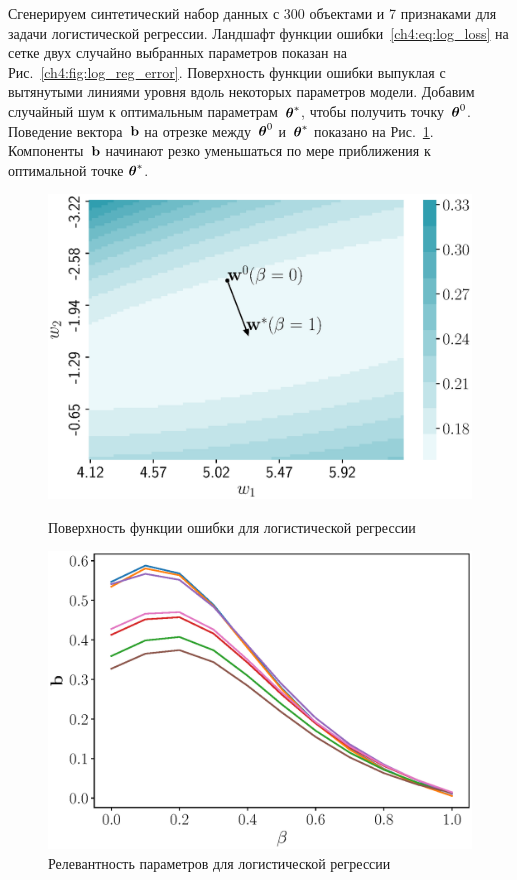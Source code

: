 Сгенерируем синтетический набор данных с 300 объектами и 7 признаками для задачи логистической регрессии. 
Ландшафт функции ошибки~\eqref{ch4:eq:log_loss} на сетке двух случайно выбранных параметров показан на Рис.~\ref{ch4:fig:log_reg_error}.
Поверхность функции ошибки выпуклая с вытянутыми линиями уровня вдоль некоторых параметров модели.
Добавим случайный шум к оптимальным параметрам~$\boldsymbol{\theta}^*$, чтобы получить точку~$\boldsymbol{\theta}^0$. Поведение вектора~$\mathbf{b}$ на отрезке между~$\boldsymbol{\theta}^0$ и~$\boldsymbol{\theta}^*$ показано на Рис.~\ref{ch4:fig:log_reg_b_wrt_beta}.
Компоненты~$\mathbf{b}$ начинают резко уменьшаться по мере приближения к оптимальной точке $\boldsymbol{\theta}^*$.
\begin{figure}[h]
	\centering
	\begin{minipage}{.47\textwidth}
		\centering
		\includegraphics[width=\linewidth]{figs/ch4/log_reg_error}
		\caption{Поверхность функции ошибки для логистической регрессии}
		\label{ch4:fig:log_reg_error}
	\end{minipage}%
	\begin{minipage}{.47\textwidth}
		\centering
		\includegraphics[width=\linewidth]{figs/ch4/log_reg_b_wrt_beta}
		\caption{Релевантность параметров для логистической регрессии}
		\label{ch4:fig:log_reg_b_wrt_beta}
	\end{minipage}
\end{figure}

